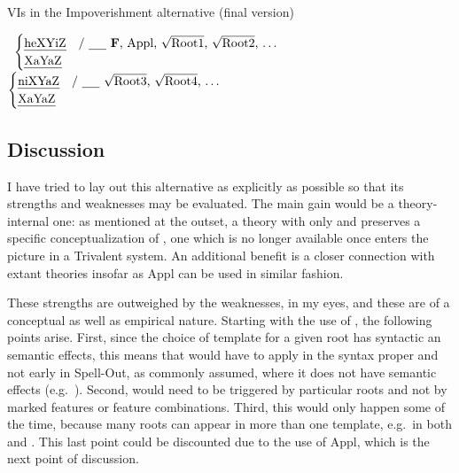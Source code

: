 \begin{exe}
\begin{xlist}
\begin{exe}
\begin{exe}
\begin{xlist}
\begin{exe}
\begin{exe}
\begin{exe}
\begin{exe}
\begin{exe}
\begin{xlist}
\begin{exe}
\begin{exe}
\begin{xlist}
\begin{exe}
\begin{xlist}
\begin{exe}
\begin{xlist}
 \begin{exe}
 \ex  \label{aas:ex:jim-vis}VIs in the Impoverishment alternative (final version) 
 \begin{xlist} 
 	\ex  {\vds} \lra~$\begin{cases} 
		\text{\thif} & \text{/ \trace~\textbf{F}, Appl, \root{Root1}, \root{Root2}, \dots}\\
		\text{\tkal} & \\
		\end{cases}$
 	\ex  {\vzs} \lra~$\begin{cases} 
		\text{\tnif} & \text{/ \trace~\root{Root3}, \root{Root4}, \dots}\\
		\text{\tkal} & \\
		\end{cases}$
 \z
\z 

	
	\subsection{Discussion} \label{aas:jim:cons}
I have tried to lay out this alternative as explicitly as possible so that its strengths and weaknesses may be evaluated. The main gain would be a theory-internal one: as mentioned at the outset, a theory with only {\vds} and {\vzs} preserves a specific conceptualization of , one which is no longer available once  enters the picture in a Trivalent system. An additional benefit is a closer connection with extant theories insofar as Appl can be used in similar fashion.

These strengths are outweighed by the weaknesses, in my eyes, and these are of a conceptual as well as empirical nature. Starting with the use of , the following points arise. First, since the choice of template for a given root has syntactic an semantic effects, this means that  would have to apply in the syntax proper and not early in Spell-Out, as commonly assumed, where it does not have semantic effects (e.g.~\citealt{harbour03}). Second,  would need to be triggered by particular roots and not by marked features or feature combinations. Third, this would only happen some of the time, because many roots can appear in more than one template, e.g.~in both {\thif} and {\tkal}. This last point could be discounted due to the use of Appl, which is the next point of discussion.


\end{xlist}
\end{exe}
\end{xlist}
\end{exe}
\end{xlist}
\end{exe}
\end{xlist}
\end{exe}
\end{exe}
\end{xlist}
\end{exe}
\end{exe}
\end{exe}
\end{exe}
\end{exe}
\end{xlist}
\end{exe}
\end{exe}
\end{xlist}
\end{exe}

